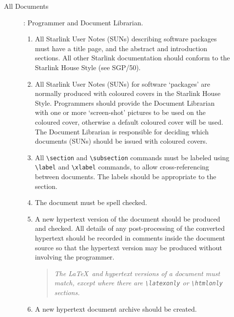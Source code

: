 \documentclass[twoside,11pt]{article}
\newcommand{\xref}[3]{#1}
\newcommand{\xlabel}[1]{}
\begin{document}
\begin{description}
\begin{description}
\begin{enumerate}
\end{enumerate}

\item [All Documents]: Programmer and Document Librarian.  

\begin{enumerate}

\item All Starlink User Notes (SUNs) describing software packages  must
have a title page, and the abstract and introduction sections.  All other
Starlink documentation should conform to the Starlink House Style (see
\xref{SGP/50}{sgp50}{}).

\item All Starlink User Notes (SUNs) for software `packages' are normally
produced with coloured covers in the Starlink House Style.  Programmers
should provide the Document Librarian with one or more
`screen-shot' pictures to be used on the coloured cover, otherwise a
default coloured cover will be used.  The Document Librarian is
responsible for deciding which documents (SUNs) should be issued with
coloured covers.

\item All {\verb+\section+} and {\verb+\subsection+} commands must be
labeled using {\verb+\label+} and {\verb+\xlabel+} commands, to allow
cross-referencing between documents.  The labels should be appropriate
to the section.

\item The document must be spell checked.

\item A new hypertext version of the document should be produced and
checked.  All details of any post-processing of the converted hypertext
should be recorded in comments inside the document source so that the
hypertext version may be produced without involving the programmer.

\begin{quote}{\em
The \LaTeX\ and hypertext versions of a document must match, except
where there are {\verb+\latexonly+} or {\verb+\htmlonly+} sections.}
\end{quote}
\item A new hypertext document archive should be created.


\end{enumerate}
\end{description}
\end{description}
\end{document}
